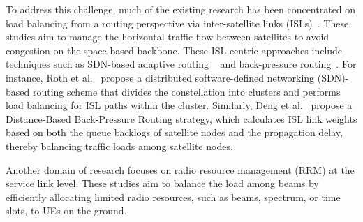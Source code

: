To address this challenge, much of the existing research has been concentrated on load balancing from a routing perspective via inter-satellite links (ISLs)~\cite{roth2022sdn,deng2023dbpr,liu2023atlb}. These studies aim to manage the horizontal traffic flow between satellites to avoid congestion on the space-based backbone. These ISL-centric approaches include techniques such as SDN-based adaptive routing ~\cite{roth2022sdn,liu2023atlb} and back-pressure routing~\cite{deng2023dbpr}. For instance, Roth et al.~\cite{roth2022sdn} propose a distributed software-defined networking (SDN)-based routing scheme that divides the constellation into clusters and performs load balancing for ISL paths within the cluster. Similarly, Deng et al.~\cite{deng2023dbpr} propose a Distance-Based Back-Pressure Routing strategy, which calculates ISL link weights based on both the queue backlogs of satellite nodes and the propagation delay, thereby balancing traffic loads among satellite nodes. %


Another domain of research focuses on radio resource management (RRM) at the service link level. These studies aim to balance the load among beams by efficiently allocating limited radio resources, such as beams, spectrum, or time slots, to UEs on the ground. %

